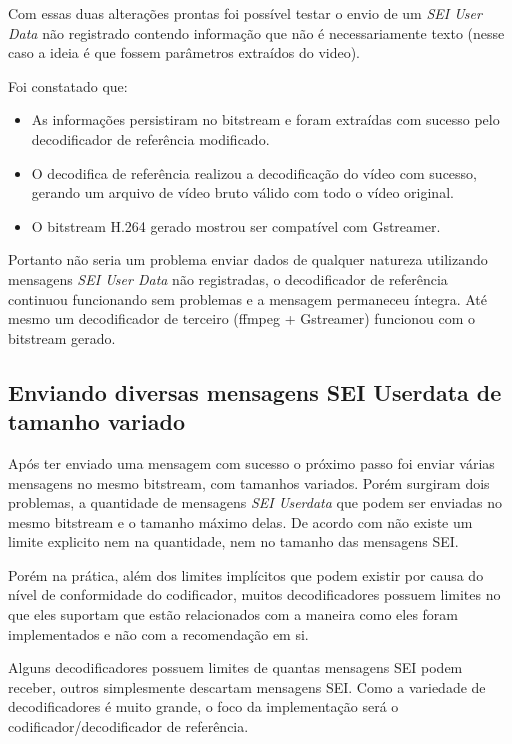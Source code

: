 Com essas duas alterações prontas foi possível testar o envio de um \textit{SEI User Data} não registrado contendo informação que não é necessariamente texto (nesse caso a ideia é que fossem parâmetros extraídos do video). 

Foi constatado que:

\begin{itemize}
        \item As informações persistiram no bitstream e foram extraídas com sucesso pelo decodificador de referência modificado.
        \item O decodifica de referência realizou a decodificação do vídeo com sucesso, gerando um arquivo de vídeo bruto válido com todo o vídeo original.
        \item O bitstream H.264 gerado mostrou ser compatível com Gstreamer.
\end{itemize}

Portanto não seria um problema enviar dados de qualquer natureza utilizando mensagens \textit{SEI User Data} não registradas, o decodificador de referência continuou funcionando sem problemas e a mensagem permaneceu íntegra. Até mesmo um decodificador de terceiro (ffmpeg + Gstreamer) funcionou com o bitstream gerado.


\subsection{Enviando diversas mensagens SEI Userdata de tamanho variado}


Após ter enviado uma mensagem com sucesso o próximo passo foi enviar várias mensagens no mesmo bitstream, com tamanhos variados. Porém surgiram dois problemas, a quantidade de mensagens \textit{SEI Userdata} que podem ser enviadas no mesmo bitstream e o tamanho máximo delas. De acordo com \cite{ituh264avc} não existe um limite explicito nem na quantidade, nem no tamanho das mensagens SEI.

Porém na prática, além dos limites implícitos que podem existir por causa do nível de conformidade do codificador, muitos decodificadores possuem limites no que eles suportam que estão relacionados com a maneira como eles foram implementados e não com a recomendação em si. 

Alguns decodificadores possuem limites de quantas mensagens SEI podem receber, outros simplesmente descartam mensagens SEI. Como a variedade de decodificadores é muito grande, o foco da implementação será o codificador/decodificador de referência.


